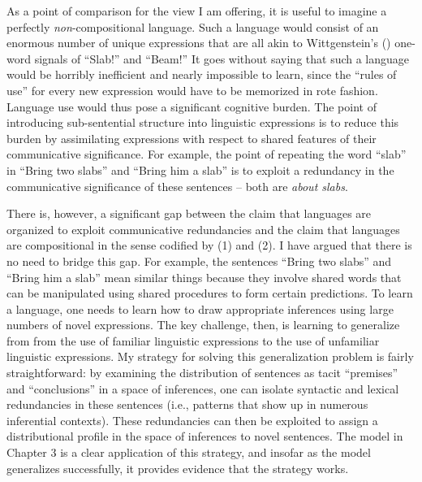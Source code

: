 As a point of comparison for the view I am offering, it is useful to imagine a perfectly \textit{non}-compositional language. Such a language would consist of an enormous number of unique expressions that are all akin to Wittgenstein's (\citeyear{Wittgenstein:1953}) one-word signals of ``Slab!'' and ``Beam!'' It goes without saying that such a language would be horribly inefficient and nearly impossible to learn, since the ``rules of use'' for every new expression would have to be memorized in rote fashion. Language use would thus pose a significant cognitive burden. The point of introducing sub-sentential structure into linguistic expressions is to reduce this burden by assimilating expressions with respect to shared features of their communicative significance. For example, the point of repeating the word ``slab'' in ``Bring two slabs'' and ``Bring him a slab'' is to exploit a redundancy in the communicative significance of these sentences -- both are \textit{about slabs}. 

There is, however, a significant gap between the claim that languages are organized to exploit communicative redundancies and the claim that languages are compositional in the sense codified by (1) and (2). I have argued that there is no need to bridge this gap. For example, the sentences ``Bring two slabs'' and ``Bring him a slab'' mean similar things because they involve shared words that can be manipulated using shared procedures to form certain predictions. To learn a language, one needs to learn how to draw appropriate inferences using large numbers of novel expressions. The key challenge, then, is learning to generalize from from the use of familiar linguistic expressions to the use of unfamiliar linguistic expressions. My strategy for solving this generalization problem is fairly straightforward: by examining the distribution of sentences as tacit ``premises'' and ``conclusions'' in a space of inferences, one can isolate syntactic and lexical redundancies in these sentences (i.e., patterns that show up in numerous inferential contexts). These redundancies can then be exploited to assign a distributional profile in the space of inferences to novel sentences.  The model in Chapter 3 is a clear application of this strategy, and insofar as the model generalizes successfully, it provides evidence that the strategy works. 

